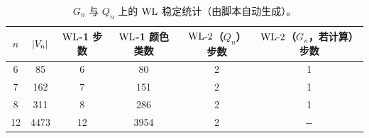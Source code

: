 \begin{center}%


\begin{table}[H]%
\centering%
\small%
\begin{tabular}{cccccc}%
\toprule%
$n$&$\left\lvert V_n\right\rvert$&$\mathrm{WL}$-1 步数&$\mathrm{WL}$-1 颜色类数&$\mathrm{WL}\text{-}2$（$Q_n$）步数&$\mathrm{WL}\text{-}2$（$G_n$，若计算）步数\\%
\midrule%
6&85&6&80&2&1\\%
7&162&7&151&2&1\\%
8&311&8&286&2&1\\%
12&4473&12&3954&2&{-}{-}\\%
\bottomrule%
\end{tabular}%
\caption{$G_n$ 与 $Q_n$ 上的 $\mathrm{WL}$ 稳定统计（由脚本自动生成）。}%
\end{table}

%
\end{center}